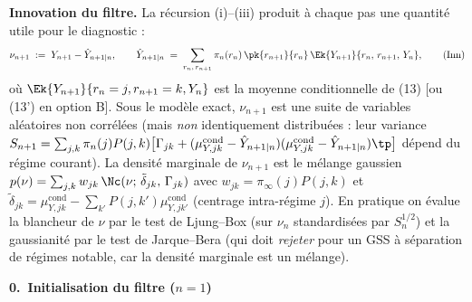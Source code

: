 \documentclass[12pt, a4paper]{article}
\begin{document}
\medskip
\noindent\textbf{Innovation du filtre.}
La récursion (i)--(iii) produit à chaque pas une quantité utile pour le diagnostic :
\begin{equation}
  \nu_{n+1} \;:=\; Y_{n+1} - \hat{Y}_{n+1\mid n},
  \qquad
  \hat{Y}_{n+1\mid n}
  \;=\; \sum_{r_n,\,r_{n+1}} \pi_n(r_n)\,\pk{r_{n+1}}{r_n}\,
        \Ek{Y_{n+1}}{r_n,\,r_{n+1},\,Y_n},
  \tag{Inn}
\end{equation}
où $\Ek{Y_{n+1}}{r_n=j,r_{n+1}=k,Y_n}$ est la moyenne conditionnelle de (13)
[ou (13') en option B].
Sous le modèle exact, $\nu_{n+1}$ est une suite de variables aléatoires
non corrélées (mais \emph{non} identiquement distribuées : leur variance
$S_{n+1} = \sum_{j,k}\pi_n(j)P(j,k)\bigl[\Gamma_{jk}+(\mu_{Y,jk}^{\mathrm{cond}}-\hat{Y}_{n+1\mid n})
(\mu_{Y,jk}^{\mathrm{cond}}-\hat{Y}_{n+1\mid n})\tp\bigr]$
dépend du régime courant).
La densité marginale de $\nu_{n+1}$ est le mélange gaussien
$p(\nu) = \sum_{j,k} w_{jk}\,\Nc(\nu;\,\tilde\delta_{jk},\,\Gamma_{jk})$
avec $w_{jk}=\pi_\infty(j)P(j,k)$ et $\tilde\delta_{jk}
= \mu_{Y,jk}^{\mathrm{cond}} - \sum_{k'} P(j,k')\mu_{Y,jk'}^{\mathrm{cond}}$
(centrage intra-régime $j$).
En pratique on évalue la blancheur de $\nu$ par le test de Ljung--Box
(sur $\nu_n$ standardisées par $S_n^{1/2}$) et la
gaussianité par le test de Jarque--Bera (qui doit \emph{rejeter} pour un GSS
à séparation de régimes notable, car la densité marginale est un mélange).

\bigskip
\noindent\textbf{0.\ Initialisation du filtre ($n = 1$)}
\end{document}
